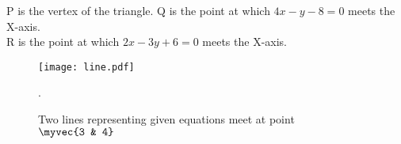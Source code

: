 \documentclass[journal,12pt,twocolumn]{IEEEtran}
\renewcommand\thesection{\arabic{section}}
\begin{document}
\begin{enumerate}[label=\thesection.\arabic*.,ref=\thesection.\theenumi]
\begin{enumerate}
        P is the vertex of the triangle.
        Q is the point at which \(4x-y-8=0\) meets the X-axis.\\
        R is the point at which \(2x-3y+6=0\) meets the X-axis.\\
\end{enumerate}
\begin{figure}[h]
\centering
\texttt{[image: line.pdf]}
\label{Fig 1.1}
\caption{Two lines representing given equations meet at point $\myvec{3 & 4}$ }.
\end{figure}
\end{enumerate}
\end{document}
